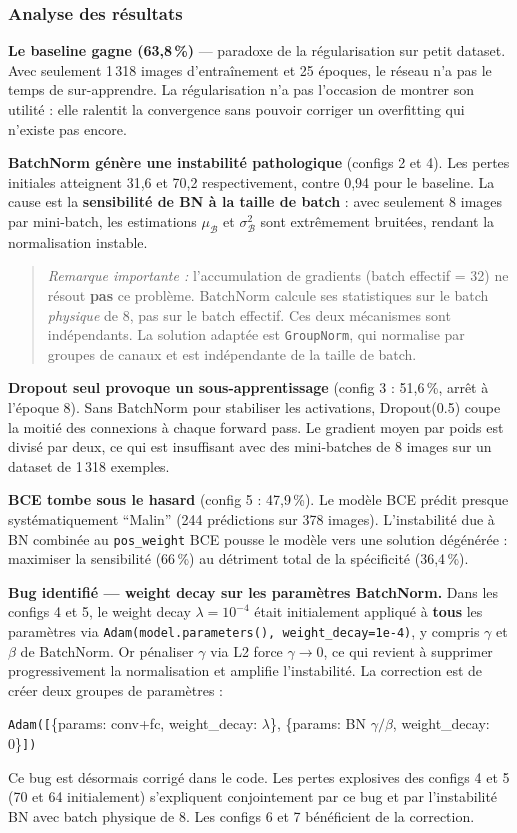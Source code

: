 \documentclass[a4paper,10pt]{article}
\begin{document}
\subsubsection*{Analyse des résultats}

\textbf{Le baseline gagne (63,8\,\%)} — paradoxe de la régularisation sur petit dataset.
Avec seulement 1\,318 images d'entraînement et 25 époques, le réseau n'a pas le temps de sur-apprendre.
La régularisation n'a pas l'occasion de montrer son utilité : elle ralentit la convergence
sans pouvoir corriger un overfitting qui n'existe pas encore.

\textbf{BatchNorm génère une instabilité pathologique} (configs 2 et 4).
Les pertes initiales atteignent 31,6 et 70,2 respectivement, contre 0,94 pour le baseline.
La cause est la \textbf{sensibilité de BN à la taille de batch} : avec seulement 8 images par
mini-batch, les estimations $\mu_\mathcal{B}$ et $\sigma_\mathcal{B}^2$ sont extrêmement bruitées,
rendant la normalisation instable.

\begin{quote}
\textit{Remarque importante :} l'accumulation de gradients (batch effectif = 32) ne résout
\textbf{pas} ce problème. BatchNorm calcule ses statistiques sur le batch \emph{physique} de 8,
pas sur le batch effectif. Ces deux mécanismes sont indépendants.
La solution adaptée est \texttt{GroupNorm}, qui normalise par groupes de canaux et
est indépendante de la taille de batch.
\end{quote}

\textbf{Dropout seul provoque un sous-apprentissage} (config 3 : 51,6\,\%, arrêt à l'époque 8).
Sans BatchNorm pour stabiliser les activations, Dropout(0.5) coupe la moitié des connexions
à chaque forward pass. Le gradient moyen par poids est divisé par deux, ce qui est insuffisant
avec des mini-batches de 8 images sur un dataset de 1\,318 exemples.

\textbf{BCE tombe sous le hasard} (config 5 : 47,9\,\%).
Le modèle BCE prédit presque systématiquement ``Malin'' (244 prédictions sur 378 images).
L'instabilité due à BN combinée au \texttt{pos\_weight} BCE pousse le modèle vers une solution
dégénérée : maximiser la sensibilité (66\,\%) au détriment total de la spécificité (36,4\,\%).

\textbf{Bug identifié — weight decay sur les paramètres BatchNorm.}
Dans les configs 4 et 5, le weight decay $\lambda = 10^{-4}$ était initialement appliqué
à \textbf{tous} les paramètres via \texttt{Adam(model.parameters(), weight\_decay=1e-4)},
y compris $\gamma$ et $\beta$ de BatchNorm.
Or pénaliser $\gamma$ via L2 force $\gamma \to 0$, ce qui revient à supprimer progressivement
la normalisation et amplifie l'instabilité. La correction est de créer deux groupes de paramètres :
\begin{center}
\texttt{Adam([}\{params: conv+fc, weight\_decay: $\lambda$\}, \{params: BN $\gamma/\beta$, weight\_decay: 0\}\texttt{])}
\end{center}
Ce bug est désormais corrigé dans le code. Les pertes explosives des configs 4 et 5
(70 et 64 initialement) s'expliquent conjointement par ce bug et par l'instabilité BN
avec batch physique de 8. Les configs 6 et 7 bénéficient de la correction.
\end{document}

